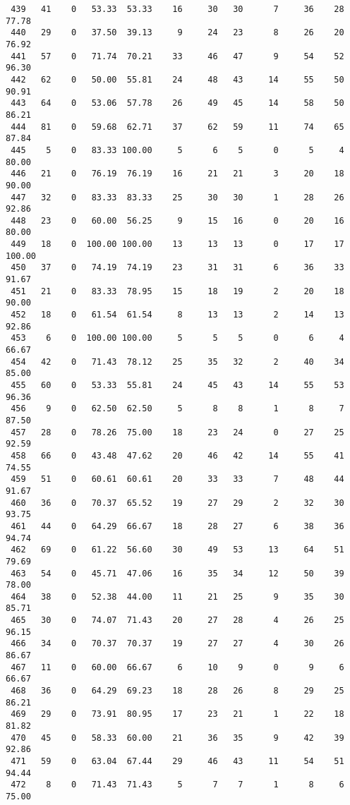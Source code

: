 \begin{verbatim}
 439   41    0   53.33  53.33    16     30   30      7     36    28    77.78
 440   29    0   37.50  39.13     9     24   23      8     26    20    76.92
 441   57    0   71.74  70.21    33     46   47      9     54    52    96.30
 442   62    0   50.00  55.81    24     48   43     14     55    50    90.91
 443   64    0   53.06  57.78    26     49   45     14     58    50    86.21
 444   81    0   59.68  62.71    37     62   59     11     74    65    87.84
 445    5    0   83.33 100.00     5      6    5      0      5     4    80.00
 446   21    0   76.19  76.19    16     21   21      3     20    18    90.00
 447   32    0   83.33  83.33    25     30   30      1     28    26    92.86
 448   23    0   60.00  56.25     9     15   16      0     20    16    80.00
 449   18    0  100.00 100.00    13     13   13      0     17    17   100.00
 450   37    0   74.19  74.19    23     31   31      6     36    33    91.67
 451   21    0   83.33  78.95    15     18   19      2     20    18    90.00
 452   18    0   61.54  61.54     8     13   13      2     14    13    92.86
 453    6    0  100.00 100.00     5      5    5      0      6     4    66.67
 454   42    0   71.43  78.12    25     35   32      2     40    34    85.00
 455   60    0   53.33  55.81    24     45   43     14     55    53    96.36
 456    9    0   62.50  62.50     5      8    8      1      8     7    87.50
 457   28    0   78.26  75.00    18     23   24      0     27    25    92.59
 458   66    0   43.48  47.62    20     46   42     14     55    41    74.55
 459   51    0   60.61  60.61    20     33   33      7     48    44    91.67
 460   36    0   70.37  65.52    19     27   29      2     32    30    93.75
 461   44    0   64.29  66.67    18     28   27      6     38    36    94.74
 462   69    0   61.22  56.60    30     49   53     13     64    51    79.69
 463   54    0   45.71  47.06    16     35   34     12     50    39    78.00
 464   38    0   52.38  44.00    11     21   25      9     35    30    85.71
 465   30    0   74.07  71.43    20     27   28      4     26    25    96.15
 466   34    0   70.37  70.37    19     27   27      4     30    26    86.67
 467   11    0   60.00  66.67     6     10    9      0      9     6    66.67
 468   36    0   64.29  69.23    18     28   26      8     29    25    86.21
 469   29    0   73.91  80.95    17     23   21      1     22    18    81.82
 470   45    0   58.33  60.00    21     36   35      9     42    39    92.86
 471   59    0   63.04  67.44    29     46   43     11     54    51    94.44
 472    8    0   71.43  71.43     5      7    7      1      8     6    75.00

\end{verbatim}
